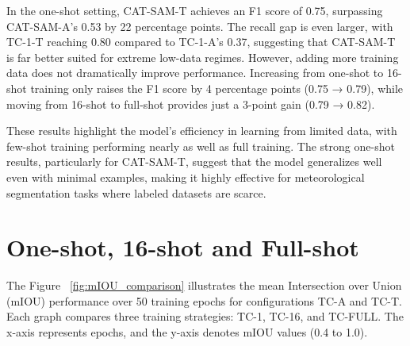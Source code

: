 In the one-shot setting, CAT-SAM-T achieves an F1 score of 0.75, surpassing CAT-SAM-A’s 0.53 by 22 percentage points. The recall gap is even larger, with TC-1-T reaching 0.80 compared to TC-1-A’s 0.37, suggesting that CAT-SAM-T is far better suited for extreme low-data regimes. However, adding more training data does not dramatically improve performance. Increasing from one-shot to 16-shot training only raises the F1 score by 4 percentage points (0.75 → 0.79), while moving from 16-shot to full-shot provides just a 3-point gain (0.79 → 0.82).

These results highlight the model’s efficiency in learning from limited data, with few-shot training performing nearly as well as full training. The strong one-shot results, particularly for CAT-SAM-T, suggest that the model generalizes well even with minimal examples, making it highly effective for meteorological segmentation tasks where labeled datasets are scarce.

\begin{table}[h]
    \centering
    \caption{Performance Metrics for Different Training Models}
    \label{tab:performance}
\end{table}

\section{One-shot, 16-shot and Full-shot}

The Figure ~\ref{fig:mIOU_comparison} illustrates the mean Intersection over Union (mIOU) performance over 50 training epochs for configurations TC-A and TC-T. Each graph compares three training strategies: TC-1, TC-16, and TC-FULL. The x-axis represents epochs, and the y-axis denotes mIOU values (0.4 to 1.0).

